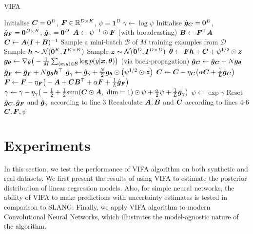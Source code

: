\documentclass[10pt]{article} %
\begin{document}
\begin{algorithm}[H] 
	\caption{VIFA}
	\label{alg:vi_fa}
	\begin{algorithmic}[1]
		\State Initialise ${\bm{C}} = \bm{0}^D$, ${\bm{F}} \in \mathbb{R}^{D \times K}$, $\psi = \bm{1}^D$
		\State $\gamma \leftarrow \log \psi$
		\State Initialise $\hat{{\bm{g}}}_{\bm{C}} = \bm{0}^D$, $\hat{{\bm{g}}}_{\bm{F}} = \bm{0}^{D \times K}$, $\hat{{\bm{g}}}_\gamma = \bm{0}^D$
		\State ${\bm{A}} \leftarrow \psi^{-1} \odot {\bm{F}}$ (with broadcasting)
		\State ${\bm{B}} \leftarrow {\bm{F}}^\top {\bm{A}}$
		\State ${\bm{C}} \leftarrow {\bm{A}} ({\bm{I}} + {\bm{B}})^{-1}$
			\State Sample a mini-batch $\mathcal{B}$ of $M$ training examples from $\mathcal{D}$
			\State Sample ${\bm{h}} \sim \mathcal{N}(\bm{0}^K, {\bm{I}}^{K \times K})$
			\State Sample ${\bm{z}} \sim \mathcal{N}(\bm{0}^D, {\bm{I}}^{D \times D})$
			\State ${\bm{\theta}} \leftarrow {\bm{F}} {\bm{h}} + {\bm{C}} + \psi^{1/2} \odot {\bm{z}}$
			\State ${\bm{g}}_{\bm{\theta}} \leftarrow \nabla_{\bm{\theta}} \big(-\frac{1}{M} \sum_{({\bm{x}}, y) \in \mathcal{B}} \log p(y | {\bm{x}}, {\bm{\theta}})\big)$ 
			(via back-propagation)
			\State $\hat{{\bm{g}}}_{\bm{C}} \leftarrow \hat{{\bm{g}}}_{\bm{C}} + N {\bm{g}}_{\bm{\theta}}$
			\State $\hat{{\bm{g}}}_{\bm{F}} \leftarrow \hat{{\bm{g}}}_{\bm{F}} + N {\bm{g}}_{\bm{\theta}} {\bm{h}}^\top$
			\State $\hat{{\bm{g}}}_\gamma \leftarrow \hat{{\bm{g}}}_\gamma + \frac{N}{2} {\bm{g}}_{\bm{\theta}} \odot \big(\psi^{1/2} \odot {\bm{z}}\big)$
				\State ${\bm{C}} \leftarrow {\bm{C}} - \eta_{\bm{C}} \big(\alpha {\bm{C}} + \frac{1}{L}\hat{{\bm{g}}}_{\bm{C}}\big)$
				\State ${\bm{F}} \leftarrow {\bm{F}} - \eta_{\bm{F}} \big(-{\bm{A}}  + {\bm{C}} {\bm{B}}^\top+ \alpha {\bm{F}} +\frac{1}{L}\hat{{\bm{g}}}_{\bm{F}}\big)$
				\State $\gamma \leftarrow \gamma - \eta_\gamma \big(-\frac{1}{2} + \frac{1}{2} \text{sum}({\bm{C}} \odot {\bm{A}}, \text{ dim} = 1) \odot \psi +\frac{\alpha}{2} \psi  + \frac{1}{L}\hat{{\bm{g}}}_\gamma\big)$
				\State $\psi \leftarrow \exp \gamma$
				\State Reset $\hat{{\bm{g}}}_{\bm{C}}, \hat{{\bm{g}}}_{\bm{F}}$ and $\hat{{\bm{g}}}_\gamma$ according to line 3
				\State Recalculate ${\bm{A}}, {\bm{B}}$ and ${\bm{C}}$ according to lines 4-6
			\EndIf
		\EndFor
	\State \Return ${\bm{C}}, {\bm{F}}, \psi$
	\end{algorithmic}
\end{algorithm}
\section{Experiments}
\label{sec: Experiments}
In this section, we test the performance of VIFA algorithm on both synthetic and real datasets. We first present the results of using VIFA to estimate the posterior distribution of linear regression models. Also, for simple neural networks, the ability of VIFA to make predictions with uncertainty estimates is tested in comparison to SLANG. Finally, we apply VIFA algorithm to modern Convolutional Neural Networks, which illustrates the model-agnostic nature of the algorithm.
\end{document}
